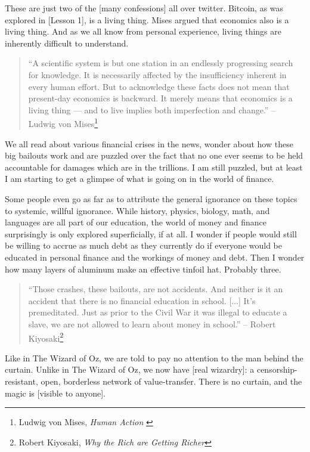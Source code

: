 These are just two of the [many confessions] all over twitter. Bitcoin,
as was explored in [Lesson 1], is a living thing. Mises argued that
economics also is a living thing. And as we all know from personal
experience, living things are inherently difficult to understand.

\begin{quotation}
``A scientific system is but one station in an endlessly progressing
search for knowledge. It is necessarily affected by the insufficiency
inherent in every human effort. But to acknowledge these facts does
not mean that present-day economics is backward. It merely means that
economics is a living thing --- and to live implies both imperfection
and change.''
\flushright -- Ludwig von Mises\footnote{Ludwig von Mises, \textit{Human Action}
\cite{human-action}}
\end{quotation}

We all read about various financial crises in the news, wonder about how
these big bailouts work and are puzzled over the fact that no one ever
seems to be held accountable for damages which are in the trillions. I
am still puzzled, but at least I am starting to get a glimpse of what is
going on in the world of finance.

Some people even go as far as to attribute the general ignorance on
these topics to systemic, willful ignorance. While history, physics,
biology, math, and languages are all part of our education, the world of
money and finance surprisingly is only explored superficially, if at
all. I wonder if people would still be willing to accrue as much debt as
they currently do if everyone would be educated in personal finance and
the workings of money and debt. Then I wonder how many layers of
aluminum make an effective tinfoil hat. Probably three.

\begin{quotation}
``Those crashes, these bailouts, are not accidents. And neither is it an
accident that there is no financial education in school. [...] It's
premeditated. Just as prior to the Civil War it was illegal to educate a slave,
we are not allowed to learn about money in school.''
\flushright -- Robert Kiyosaki\footnote{Robert Kiyosaki, \textit{Why the Rich
are Getting Richer}\cite{robert-kiyosaki}}
\end{quotation}

Like in The Wizard of Oz, we are told to pay no attention to the man
behind the curtain. Unlike in The Wizard of Oz, we now have [real
wizardry]: a censorship-resistant, open, borderless network of
value-transfer. There is no curtain, and the magic is [visible to
anyone].

